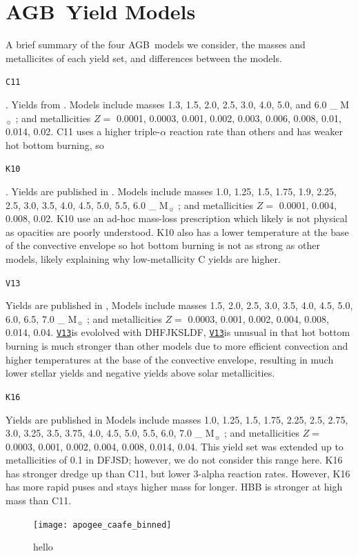\documentclass[fleqn,usenatbib]{mnras}
\newcommand{\vxiii}{\texttt{\hyperlink{V13}{V13}}}
\newcommand{\agb}{AGB}
\newcommand{\Mo}{%
    \ifmmode {\rm M}_{\sun}%
    \else M$_{\sun}$
    \fi}
\begin{document}
\section{\agb\ Yield Models} \label{sec:oob_models}
A brief summary of the four \agb\ models we consider, the masses and metallicites of each yield set, and differences between the models.

\hypertarget{C11}{\texttt{C11}}. 
Yields from \citet{cristallo+11,cristallo+15}. 
Models include masses 1.3, 1.5, 2.0, 2.5, 3.0, 4.0, 5.0, and 6.0 \Mo; and 
metallicities $Z = $ 0.0001, 0.0003, 0.001, 0.002, 0.003, 0.006, 0.008, 0.01, 0.014, 0.02. 
C11 uses a higher triple-$\alpha$ reaction rate than others and has weaker hot bottom burning, so 

\hypertarget{K10}{\texttt{K10}}.
Yields are published in \citet{karakas10}. 
Models include masses  1.0, 1.25, 1.5, 1.75, 1.9, 2.25, 2.5, 3.0, 3.5, 4.0, 4.5, 5.0, 5.5, 6.0 \Mo;
and metallicities $Z=$ 0.0001, 0.004, 0.008, 0.02. K10 use an ad-hoc mass-loss prescription which likely is not physical as opacities are poorly understood. K10 also has a lower temperature at the base of the convective envelope so hot bottom burning is not as strong as other models, likely explaining why low-metallicity C yields are higher.

\hypertarget{V13}{\texttt{V13}} 
Yields are published in \citet{ventura+13,ventura+14,ventura+18,vincenzo+21}, 
Models include masses 1.5, 2.0, 2.5, 3.0, 3.5, 4.0, 4.5, 5.0, 6.0, 6.5, 7.0 \Mo; 
and metallicities $Z=$ 0.0003, 0.001, 0.002, 0.004, 0.008, 0.014, 0.04.
\vxiii is evololved with DHFJKSLDF,
\vxiii is unusual in that hot bottom burning is much stronger than other models due to more efficient convection and higher temperatures at the base of the convective envelope, resulting in much lower stellar yields and negative yields above solar metallicities.


\hypertarget{K16}{\texttt{K16}} 
Yields are published in \citet{KL16,karakas+18}
Models include masses 1.0, 1.25, 1.5, 1.75, 2.25, 2.5, 2.75, 3.0, 3.25, 3.5, 3.75, 4.0, 4.5, 5.0, 5.5, 6.0, 7.0 \Mo; 
and metallicities $Z=$ 0.0003, 0.001, 0.002, 0.004, 0.008, 0.014, 0.04.
This yield set was extended up to metallicities of 0.1 in DFJSD; however, we do not consider this range here. K16 has stronger dredge up than C11, but lower 3-alpha reaction rates. However, K16 has more rapid puses and stays higher mass for longer. HBB is stronger at high mass than C11.


\begin{figure}
    \centering
    \texttt{[image: apogee\_caafe\_binned]}
    \caption{hello}
    \label{fig:caafe_binned}
\end{figure}


\bsp	%
\label{lastpage}
\end{document}
